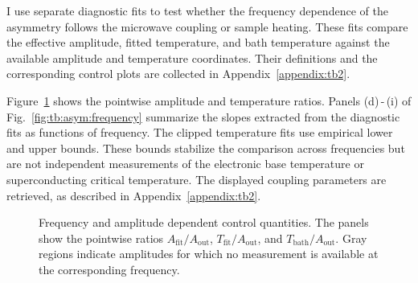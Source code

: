         I use separate diagnostic fits to test whether the frequency dependence of the asymmetry follows the microwave coupling or sample heating. These fits compare the effective amplitude, fitted temperature, and bath temperature against the available amplitude and temperature coordinates. Their definitions and the corresponding control plots are collected in Appendix~\ref{appendix:tb2}.

        Figure~\ref{fig:tb:asym:control-map} shows the pointwise amplitude and temperature ratios. Panels (d)\,-\,(i) of Fig.~\ref{fig:tb:asym:frequency} summarize the slopes extracted from the diagnostic fits as functions of frequency. The clipped temperature fits use empirical lower and upper bounds. These bounds stabilize the comparison across frequencies but are not independent measurements of the electronic base temperature or superconducting critical temperature. The displayed coupling parameters are retrieved, as described in Appendix~\ref{appendix:tb2}.

        \begin{figure}[t]
            \centering
            \hfill
            \hfill
            \caption{
                Frequency and amplitude dependent control quantities. The panels show the pointwise ratios $A_\mathrm{fit}/A_\mathrm{out}$, $T_\mathrm{fit}/A_\mathrm{out}$, and $T_\mathrm{bath}/A_\mathrm{out}$. Gray regions indicate amplitudes for which no measurement is available at the corresponding frequency.
            }
            \label{fig:tb:asym:control-map}
        \end{figure}

